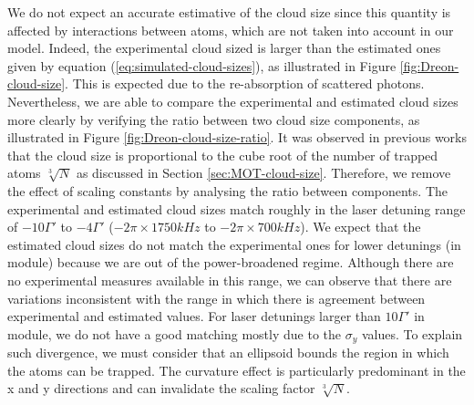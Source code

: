 We do not expect an accurate estimative of the cloud size since this quantity is affected by interactions between atoms, which are not taken into account in our model. Indeed, the experimental cloud sized is larger than the estimated ones given by equation (\ref{eq:simulated-cloud-sizes}), as illustrated in Figure \ref{fig:Dreon-cloud-size}. This is expected due to the re-absorption of scattered photons. Nevertheless, we are able to compare the experimental and estimated cloud sizes more clearly by verifying the ratio between two cloud size components, as illustrated in Figure \ref{fig:Dreon-cloud-size-ratio}. It was observed in previous works \cite{PhysRevA.90.063404} that the cloud size is proportional to the cube root of the number of trapped atoms $ \sqrt[3]{N} $ as discussed in Section \ref{sec:MOT-cloud-size}. Therefore, we remove the effect of scaling constants by analysing the ratio between components. The experimental and estimated cloud sizes match roughly in the laser detuning range of $ -10\Gamma' $ to $ -4\Gamma' $ ($ -2\pi \times 1750 kHz $ to $ -2\pi \times 700 kHz $). We expect that the estimated cloud sizes do not match the experimental ones for lower detunings (in module) because we are out of the power-broadened regime. Although there are no experimental measures available in this range, we can observe that there are variations inconsistent with the range in which there is agreement between experimental and estimated values. For laser detunings larger than $ 10\Gamma' $ in module, we do not have a good matching mostly due to the $ \sigma_y $ values. To explain such divergence, we must consider that an ellipsoid bounds the region in which the atoms can be trapped. The curvature effect is particularly predominant in the x and y directions and can invalidate the scaling factor $ \sqrt[3]{N} $.

